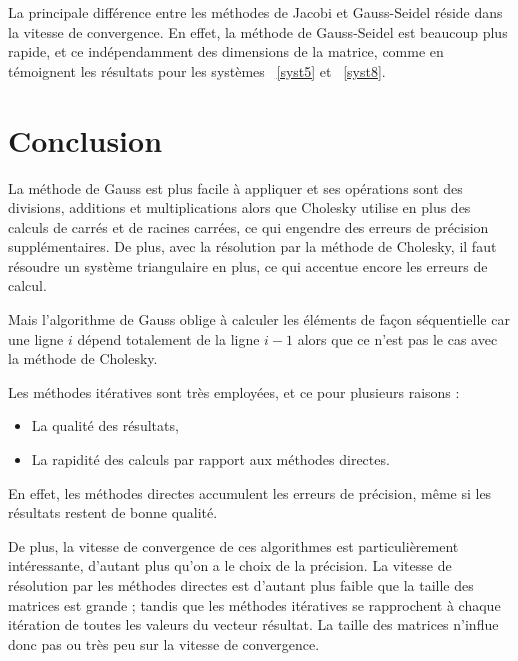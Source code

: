 \documentclass{report}
\begin{document}
        La principale différence entre les méthodes de Jacobi et Gauss-Seidel réside dans la vitesse de convergence. En effet, la méthode de Gauss-Seidel est beaucoup plus rapide, et ce indépendamment des dimensions de la matrice, comme en témoignent les résultats pour les systèmes ~\eqref{syst5} et ~\eqref{syst8}.

        
        
  \chapter{Conclusion}
    
    La méthode de Gauss est plus facile à appliquer et ses opérations sont des divisions, additions et multiplications alors que Cholesky utilise en plus des calculs de carrés et de racines carrées, ce qui engendre des erreurs de précision supplémentaires. De plus, avec la résolution par la méthode de Cholesky, il faut résoudre un système triangulaire en plus, ce qui accentue encore les erreurs de calcul.
    
    \vspace{0.3cm}
    Mais l'algorithme de Gauss oblige à calculer les éléments de façon séquentielle car une ligne $i$ dépend totalement de la ligne $i-1$ alors que ce n'est pas le cas avec la méthode de Cholesky.

    \vspace{0.3cm}
    Les méthodes itératives sont très employées, et ce pour plusieurs raisons :
        \begin{itemize}
          \item{La qualité des résultats,}
          \item{La rapidité des calculs par rapport aux méthodes directes.}
        \end{itemize}
    \vspace{0.3cm}
    En effet, les méthodes directes accumulent les erreurs de précision, même si les résultats restent de bonne qualité.
    
    \vspace{0.3cm}
    De plus, la vitesse de convergence de ces algorithmes est particulièrement intéressante, d'autant plus qu'on a le choix de la précision. La vitesse de résolution par les méthodes directes est d'autant plus faible que la taille des matrices est grande ; tandis que les méthodes itératives se rapprochent à chaque itération de toutes les valeurs du vecteur résultat. La taille des matrices n'influe donc pas ou très peu sur la vitesse de convergence.
    \newpage
\end{document}
